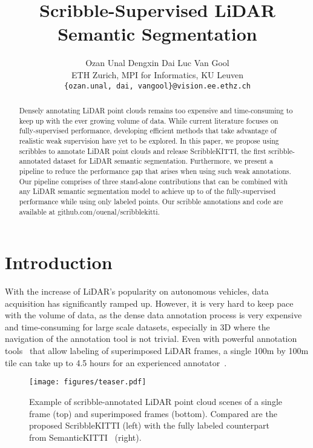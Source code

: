 \documentclass[10pt,twocolumn,letterpaper]{article}
\begin{document}
\title{Scribble-Supervised LiDAR Semantic Segmentation}

\author{
Ozan Unal \qquad Dengxin Dai \qquad Luc Van Gool \\
ETH Zurich, MPI for Informatics, KU Leuven \\
{\tt\small \{ozan.unal, dai, vangool\}@vision.ee.ethz.ch}
}
\maketitle

\begin{abstract}
Densely annotating LiDAR point clouds remains too expensive and time-consuming to keep up with the ever growing volume of data. While current literature focuses on fully-supervised performance, developing efficient methods that take advantage of realistic weak supervision have yet to be explored. In this paper, we propose using scribbles to annotate LiDAR point clouds and release ScribbleKITTI, the first scribble-annotated dataset for LiDAR semantic segmentation. Furthermore, we present a pipeline to reduce the performance gap that arises when using such weak annotations. Our pipeline comprises of three stand-alone contributions that can be combined with any LiDAR semantic segmentation model to achieve up to  of the fully-supervised performance while using only  labeled points. Our scribble annotations and code are available at github.com/ouenal/scribblekitti.
\end{abstract}

\section{Introduction}

With the increase of LiDAR's popularity on autonomous vehicles, data acquisition has significantly ramped up. However, it is very hard to keep pace with the volume of data, as the dense data annotation process is very expensive and time-consuming for large scale datasets, especially in 3D where the navigation of the annotation tool is not trivial. Even with powerful annotation tools~\cite{iccv2019semantickitti} that allow labeling of superimposed LiDAR frames, a single 100m by 100m tile can take up to 4.5 hours for an experienced annotator~\cite{iccv2019semantickitti}.

\begin{figure}
    \centering
    \texttt{[image: figures/teaser.pdf]}
    \caption{Example of scribble-annotated LiDAR point cloud scenes of a single frame (top) and  superimposed frames (bottom). Compared are  the proposed ScribbleKITTI (left) with  the fully labeled counterpart from SemanticKITTI~\cite{iccv2019semantickitti} (right).}
    \label{fig:teaser}
\end{figure}
\end{document}
